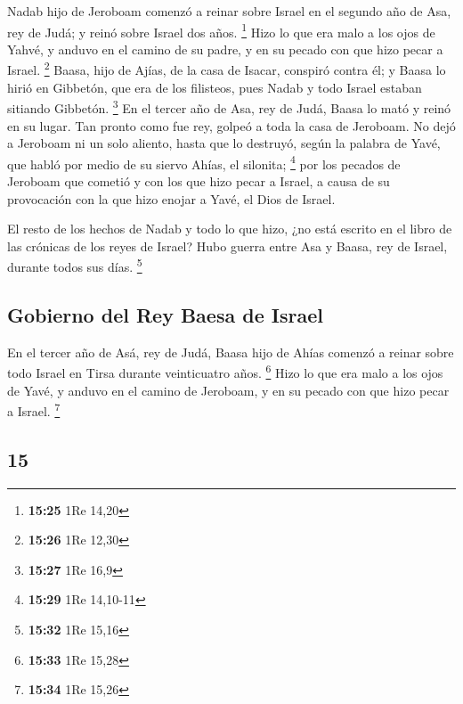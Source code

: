 \begin{paracol}{2}
 Nadab hijo de Jeroboam comenzó a reinar sobre Israel en
el segundo año de Asa, rey de Judá; y reinó sobre Israel dos años.
\footnote{\textbf{15:25} 1Re 14,20}  Hizo lo que era malo
a los ojos de Yahvé, y anduvo en el camino de su padre, y en su pecado
con que hizo pecar a Israel. \footnote{\textbf{15:26} 1Re 12,30}
 Baasa, hijo de Ajías, de la casa de Isacar, conspiró
contra él; y Baasa lo hirió en Gibbetón, que era de los filisteos, pues
Nadab y todo Israel estaban sitiando Gibbetón. \footnote{\textbf{15:27}
  1Re 16,9}  En el tercer año de Asa, rey de Judá, Baasa
lo mató y reinó en su lugar.  Tan pronto como fue rey,
golpeó a toda la casa de Jeroboam. No dejó a Jeroboam ni un solo
aliento, hasta que lo destruyó, según la palabra de Yavé, que habló por
medio de su siervo Ahías, el silonita; \footnote{\textbf{15:29} 1Re
  14,10-11}  por los pecados de Jeroboam que cometió y
con los que hizo pecar a Israel, a causa de su provocación con la que
hizo enojar a Yavé, el Dios de Israel.

 El resto de los hechos de Nadab y todo lo que hizo, ¿no
está escrito en el libro de las crónicas de los reyes de Israel?
 Hubo guerra entre Asa y Baasa, rey de Israel, durante
todos sus días. \footnote{\textbf{15:32} 1Re 15,16}

\hypertarget{gobierno-del-rey-baesa-de-israel}{%
\subsection{Gobierno del Rey Baesa de
Israel}\label{gobierno-del-rey-baesa-de-israel}}

 En el tercer año de Asá, rey de Judá, Baasa hijo de
Ahías comenzó a reinar sobre todo Israel en Tirsa durante veinticuatro
años. \footnote{\textbf{15:33} 1Re 15,28}  Hizo lo que
era malo a los ojos de Yavé, y anduvo en el camino de Jeroboam, y en su
pecado con que hizo pecar a Israel. \footnote{\textbf{15:34} 1Re 15,26}

\switchcolumn
\begin{otherlanguage}{english}

\hypertarget{section-29}{%
\section{15}\label{section-29}}


\end{otherlanguage}
\end{paracol}
